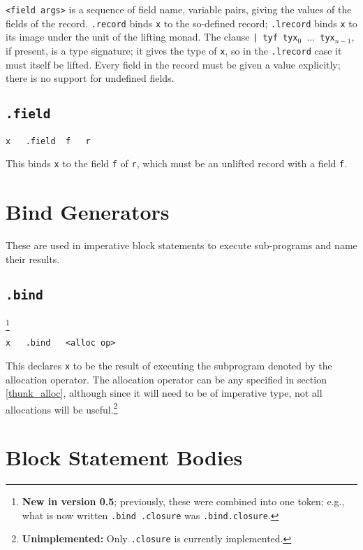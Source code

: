 \documentclass{report}
\newcommand\stringcode[1]{\texttt{#1}}
\newcommand\unimpl[1]{\footnote{\textbf{Unimplemented: }#1}}
\newcommand\new[2]{\footnote{\textbf{New in version #1}; previously, #2}}
\begin{document}
\stringcode{<field args>} is a sequence of field name, variable pairs, giving the values of the fields of the record.
\stringcode{.record} binds \stringcode{x} to the so-defined record;
\stringcode{.lrecord} binds \stringcode{x} to its image under the unit of the lifting monad.
The clause \stringcode{| tyf tyx$_0$ $\ldots$ tyx$_{n-1}$}, if present, is a type signature;
it gives the type of \stringcode{x}, so in the \stringcode{.lrecord} case it must itself be lifted.
Every field in the record must be given a value explicitly; there is no support for undefined fields.

\subsection{\stringcode{.field}}

\begin{verbatim}
x	.field	f	r
\end{verbatim}

This binds \stringcode{x} to the field \stringcode{f} of \stringcode{r}, which must be an unlifted record with a field \stringcode{f}.

\section{Bind Generators}
\label{bind}

These are used in imperative block statements to execute sub-programs and name their results.

\subsection{\stringcode{.bind}}
\new{0.5}{these were combined into one token; e.g., what is now written \stringcode{.bind	.closure} was \stringcode{.bind.closure}.}

\begin{verbatim}
x	.bind	<alloc op>
\end{verbatim}

This declares \stringcode{x} to be the result of executing the subprogram denoted by the allocation operator.
The allocation operator can be any specified in section \ref{thunk_alloc},
although since it will need to be of imperative type, not all allocations will be useful.\unimpl{Only \stringcode{.closure} is currently implemented.}

\section{Block Statement Bodies}
\label{body}
\end{document}
